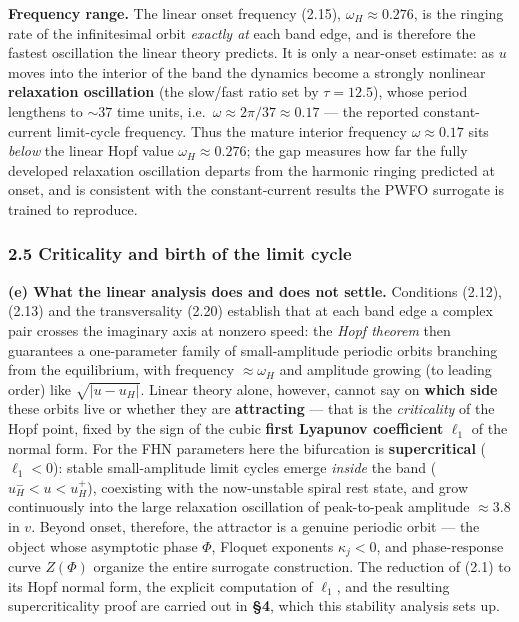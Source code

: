 \documentclass[
  11pt,
]{article}
\providecommand{\lt}{<}
\begin{document}
\textbf{Frequency range.} The linear onset frequency (2.15),
\(\omega_H \approx 0.276\), is the ringing rate of the infinitesimal
orbit \emph{exactly at} each band edge, and is therefore the fastest
oscillation the linear theory predicts. It is only a near-onset
estimate: as \(u\) moves into the interior of the band the dynamics
become a strongly nonlinear \textbf{relaxation oscillation} (the
slow/fast ratio set by \(\tau = 12.5\)), whose period lengthens to
\(\sim 37\) time units, i.e.~\(\omega \approx 2\pi/37 \approx 0.17\) ---
the reported constant-current limit-cycle frequency. Thus the mature
interior frequency \(\omega \approx 0.17\) sits \emph{below} the linear
Hopf value \(\omega_H \approx 0.276\); the gap measures how far the
fully developed relaxation oscillation departs from the harmonic ringing
predicted at onset, and is consistent with the constant-current results
the PWFO surrogate is trained to reproduce.

\subsubsection{2.5 Criticality and birth of the limit
cycle}\label{criticality-and-birth-of-the-limit-cycle}

\textbf{(e) What the linear analysis does and does not settle.}
Conditions (2.12), (2.13) and the transversality (2.20) establish that
at each band edge a complex pair crosses the imaginary axis at nonzero
speed: the \emph{Hopf theorem} then guarantees a one-parameter family of
small-amplitude periodic orbits branching from the equilibrium, with
frequency \(\approx \omega_H\) and amplitude growing (to leading order)
like \(\sqrt{|u - u_H|}\). Linear theory alone, however, cannot say on
\textbf{which side} these orbits live or whether they are
\textbf{attracting} --- that is the \emph{criticality} of the Hopf
point, fixed by the sign of the cubic \textbf{first Lyapunov
coefficient} \(\ell_1\) of the normal form. For the FHN parameters here
the bifurcation is \textbf{supercritical} (\(\ell_1 \lt  0\)): stable
small-amplitude limit cycles emerge \emph{inside} the band
(\(u_H^- \lt  u \lt  u_H^+\)), coexisting with the now-unstable spiral
rest state, and grow continuously into the large relaxation oscillation
of peak-to-peak amplitude \(\approx 3.8\) in \(v\). Beyond onset,
therefore, the attractor is a genuine periodic orbit --- the object
whose asymptotic phase \(\Phi\), Floquet exponents \(\kappa_j\lt 0\),
and phase-response curve \(Z(\Phi)\) organize the entire surrogate
construction. The reduction of (2.1) to its Hopf normal form, the
explicit computation of \(\ell_1\), and the resulting supercriticality
proof are carried out in \textbf{§4}, which this stability analysis sets
up.
\end{document}
